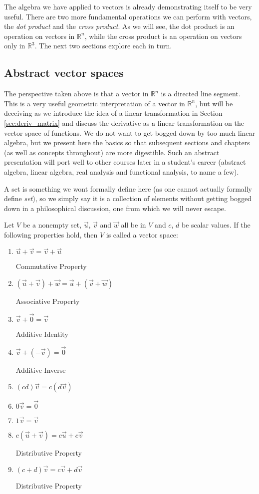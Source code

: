 The algebra we have applied to vectors is already demonstrating itself to be very useful. There are two more fundamental operations we can perform with vectors, the \emph{dot product} and the \emph{cross product}. As we will see, the dot product is an operation on vectors in $\mathbb{R}^n$, while the cross product is an operation on vectors only in $\mathbb{R}^3$. The next two sections explore each in turn.


\subsection{Abstract vector spaces}

The perspective taken above is that a vector in $\mathbb{R}^n$ is a directed line segment.  This is a very useful geometric interpretation of a vector in $\mathbb{R}^n$, but will be deceiving as we introduce the idea of a linear transformation in Section \ref{sec:deriv_matrix} and discuss the derivative as a linear transformation on the vector space of functions.  We do not want to get bogged down by too much linear algebra, but we present here the basics so that subsequent sections and chapters (as well as concepts throughout) are more digestible.  Such an abstract presentation will  port well to other courses later in a student's career (abstract algebra, linear algebra, real analysis and functional analysis, to name a few).

\bigskip

A set is something we wont formally define here (as one cannot actually formally define \textit{set}), so we simply say it is a collection of elements without getting bogged down in a philosophical discussion, one from which we will never escape.  

{Let $V$ be a nonempty set, $\vec u$, $\vec v$ and $\vec w$ all be in $V$ and $c$, $d$ be scalar values.  If the following properties hold, then $V$ is called a vector space: 
\begin{enumerate}
	\item \parbox{150pt}{$\vec u+\vec v = \vec v+\vec u$}Commutative Property
	\item \parbox{150pt}{$(\vec u+\vec v)+\vec w = \vec u+(\vec v+\vec w)$}Associative Property
	\item \parbox{150pt}{$\vec v+\vec 0 = \vec v$}Additive Identity
\item \parbox{150pt}{$\vec v+ (-\vec v) = \vec 0$}Additive Inverse
	\item \parbox{150pt}{$(cd)\vec v= c(d\vec v)$}
		\item \parbox{150pt}{$0\vec v = \vec 0$}
	\item \parbox{150pt}{$1\vec v = \vec v$}
	\item \parbox{150pt}{$c(\vec u+\vec v) = c\vec u+c\vec v$}Distributive Property
	\item \parbox{150pt}{$(c+d)\vec v = c\vec v+d\vec v$}Distributive Property
\end{enumerate}
}

